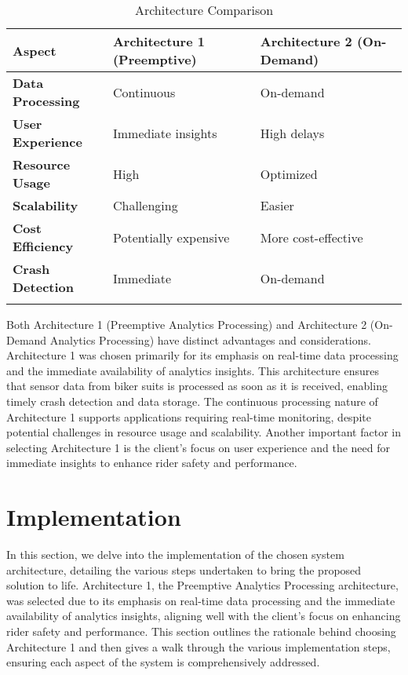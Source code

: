\begin{longtable}{|p{3cm}|p{5cm}|p{5cm}|}
\hline
\textbf{Aspect} & \textbf{Architecture 1 (Preemptive)} & \textbf{Architecture 2 (On-Demand)} \\
\hline
\textbf{Data Processing} & Continuous & On-demand \\
\hline
\textbf{User Experience} & Immediate insights & High delays \\
\hline
\textbf{Resource Usage} & High & Optimized \\
\hline
\textbf{Scalability} & Challenging & Easier \\
\hline
\textbf{Cost Efficiency} & Potentially expensive & More cost-effective \\
\hline
\textbf{Crash Detection} & Immediate & On-demand \\
\hline
\caption{Architecture Comparison}
\label{table:architecture_comparison}
\end{longtable}
Both Architecture 1 (Preemptive Analytics Processing) and Architecture 2 (On-Demand Analytics Processing) have distinct advantages and considerations. Architecture 1 was chosen primarily for its emphasis on real-time data processing and the immediate availability of analytics insights. This architecture ensures that sensor data from biker suits is processed as soon as it is received, enabling timely crash detection and data storage. The continuous processing nature of Architecture 1 supports applications requiring real-time monitoring, despite potential challenges in resource usage and scalability. Another important factor in selecting Architecture 1 is the client's focus on user experience and the need for immediate insights to enhance rider safety and performance.


\section{Implementation}
\label{sec:implementation}

In this section, we delve into the implementation of the chosen system architecture, detailing the various steps undertaken to bring the proposed solution to life. Architecture 1, the Preemptive Analytics Processing architecture, was selected due to its emphasis on real-time data processing and the immediate availability of analytics insights, aligning well with the client's focus on enhancing rider safety and performance. This section outlines the rationale behind choosing Architecture 1 and then gives a walk through the various implementation steps, ensuring each aspect of the system is comprehensively addressed.

